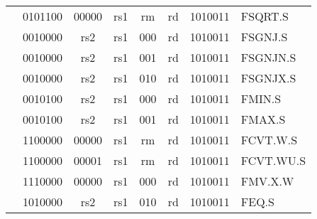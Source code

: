 \begin{table}[p]
\begin{small}
\begin{center}
\begin{tabular}{p{0in}p{0.4in}p{0.05in}p{0.05in}p{0.05in}p{0.05in}p{0.4in}p{0.6in}p{0.4in}p{0.6in}p{0.7in}l}
&
\multicolumn{4}{|c|}{0101100} &
\multicolumn{2}{c|}{00000} &
\multicolumn{1}{c|}{rs1} &
\multicolumn{1}{c|}{rm} &
\multicolumn{1}{c|}{rd} &
\multicolumn{1}{c|}{1010011} & FSQRT.S \\
\cline{2-11}
  

&
\multicolumn{4}{|c|}{0010000} &
\multicolumn{2}{c|}{rs2} &
\multicolumn{1}{c|}{rs1} &
\multicolumn{1}{c|}{000} &
\multicolumn{1}{c|}{rd} &
\multicolumn{1}{c|}{1010011} & FSGNJ.S \\
\cline{2-11}
  

&
\multicolumn{4}{|c|}{0010000} &
\multicolumn{2}{c|}{rs2} &
\multicolumn{1}{c|}{rs1} &
\multicolumn{1}{c|}{001} &
\multicolumn{1}{c|}{rd} &
\multicolumn{1}{c|}{1010011} & FSGNJN.S \\
\cline{2-11}
  

&
\multicolumn{4}{|c|}{0010000} &
\multicolumn{2}{c|}{rs2} &
\multicolumn{1}{c|}{rs1} &
\multicolumn{1}{c|}{010} &
\multicolumn{1}{c|}{rd} &
\multicolumn{1}{c|}{1010011} & FSGNJX.S \\
\cline{2-11}
  

&
\multicolumn{4}{|c|}{0010100} &
\multicolumn{2}{c|}{rs2} &
\multicolumn{1}{c|}{rs1} &
\multicolumn{1}{c|}{000} &
\multicolumn{1}{c|}{rd} &
\multicolumn{1}{c|}{1010011} & FMIN.S \\
\cline{2-11}
  

&
\multicolumn{4}{|c|}{0010100} &
\multicolumn{2}{c|}{rs2} &
\multicolumn{1}{c|}{rs1} &
\multicolumn{1}{c|}{001} &
\multicolumn{1}{c|}{rd} &
\multicolumn{1}{c|}{1010011} & FMAX.S \\
\cline{2-11}
  

&
\multicolumn{4}{|c|}{1100000} &
\multicolumn{2}{c|}{00000} &
\multicolumn{1}{c|}{rs1} &
\multicolumn{1}{c|}{rm} &
\multicolumn{1}{c|}{rd} &
\multicolumn{1}{c|}{1010011} & FCVT.W.S \\
\cline{2-11}
  

&
\multicolumn{4}{|c|}{1100000} &
\multicolumn{2}{c|}{00001} &
\multicolumn{1}{c|}{rs1} &
\multicolumn{1}{c|}{rm} &
\multicolumn{1}{c|}{rd} &
\multicolumn{1}{c|}{1010011} & FCVT.WU.S \\
\cline{2-11}
  

&
\multicolumn{4}{|c|}{1110000} &
\multicolumn{2}{c|}{00000} &
\multicolumn{1}{c|}{rs1} &
\multicolumn{1}{c|}{000} &
\multicolumn{1}{c|}{rd} &
\multicolumn{1}{c|}{1010011} & FMV.X.W \\
\cline{2-11}
  

&
\multicolumn{4}{|c|}{1010000} &
\multicolumn{2}{c|}{rs2} &
\multicolumn{1}{c|}{rs1} &
\multicolumn{1}{c|}{010} &
\multicolumn{1}{c|}{rd} &
\multicolumn{1}{c|}{1010011} & FEQ.S \\
\cline{2-11}
  


\end{tabular}
\end{center}
\end{small}
\end{table}
